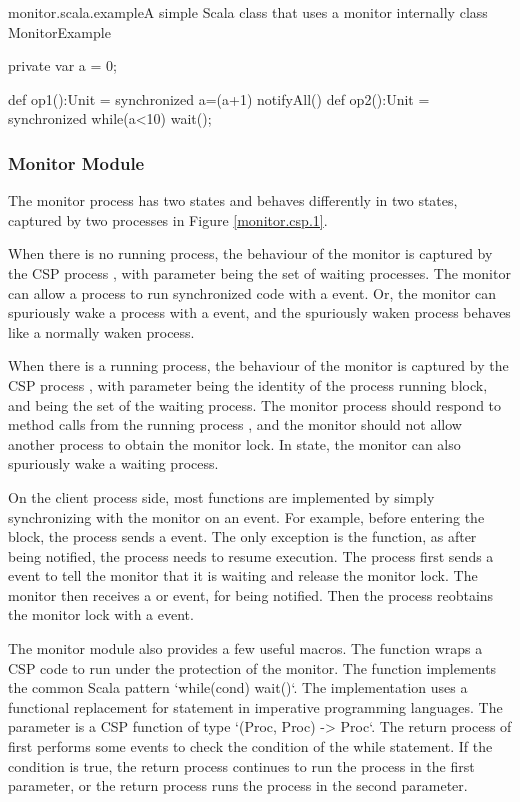\documentclass[a4paper, 12pt]{article}
\begin{document}
\begin{scalafloat}{monitor.scala.example}{A simple Scala class that uses a monitor internally}
class MonitorExample {
  private var a = 0;

  def op1():Unit = synchronized{ 
    a=(a+1)%
    notifyAll()
  }
  def op2():Unit = synchronized{ 
    while(a<10) wait();
  }
}
\end{scalafloat}
  
\subsubsection{Monitor Module}
The monitor process has two states and behaves differently in two states, captured by two processes in Figure \ref{monitor.csp.1}.

When there is no running process, the behaviour of the monitor is captured by the CSP process , with parameter  being the set of waiting processes. The monitor can allow a process to run synchronized code with a  event. Or, the monitor can spuriously wake a process with a  event, and the spuriously waken process behaves like a normally waken process.

When there is a running process, the behaviour of the monitor is captured by the CSP process , with parameter  being the identity of the process running  block, and  being the set of the waiting process. The monitor process should respond to method calls from the running process , and the monitor should not allow another process to obtain the monitor lock. In  state, the monitor can also spuriously wake a waiting process. 

On the client process side, most functions are implemented by simply synchronizing with the monitor on an event. For example, before entering the  block, the process sends a  event. The only exception is the  function, as after being notified, the process needs to resume execution. The process first sends a  event to tell the monitor that it is waiting and release the monitor lock. The monitor then receives a  or  event, for being notified. Then the process reobtains the monitor lock with a  event. 

The monitor module also provides a few useful macros. The  function wraps a CSP code to run under the protection of the monitor. The  function implements the common Scala pattern `while(cond) wait()`. The implementation uses a functional replacement for  statement in imperative programming languages. The  parameter is a CSP function of type `(Proc, Proc) -> Proc`. The return process of  first performs some events to check the condition of the while statement. If the condition is true, the return process continues to run the process in the first parameter, or the return process runs the process in the second parameter.
\end{document}
